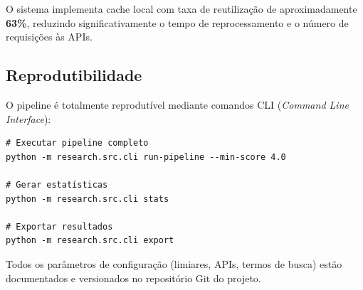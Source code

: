 O sistema implementa cache local com taxa de reutilização de aproximadamente \textbf{63\%}, reduzindo significativamente o tempo de reprocessamento e o número de requisições às APIs.

\subsection{Reprodutibilidade}

O pipeline é totalmente reprodutível mediante comandos CLI (\textit{Command Line Interface}):

\begin{verbatim}
# Executar pipeline completo
python -m research.src.cli run-pipeline --min-score 4.0

# Gerar estatísticas
python -m research.src.cli stats

# Exportar resultados
python -m research.src.cli export
\end{verbatim}

Todos os parâmetros de configuração (limiares, APIs, termos de busca) estão documentados e versionados no repositório Git do projeto.

